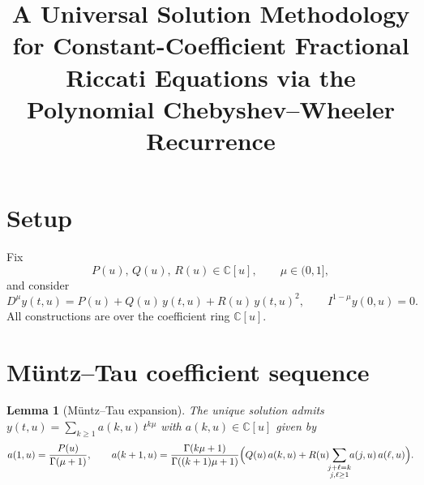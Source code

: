 \documentclass[11pt]{article}
\title{A Universal Solution Methodology for Constant-Coefficient
Fractional Riccati Equations via the Polynomial Chebyshev--Wheeler
Recurrence}
\author{}
\date{}
\newtheorem{lemma}[theorem]{Lemma}
\theoremstyle{definition}
\begin{document}
\maketitle

\section{Setup}

Fix
\[
P(u),\, Q(u),\, R(u) \in \mathbb{C}[u], \qquad \mu \in (0,1],
\]
and consider
\[
D^{\mu} y(t,u) = P(u) + Q(u)\, y(t,u) + R(u)\, y(t,u)^{2},
\qquad I^{1-\mu} y(0,u) = 0.
\]
All constructions are over the coefficient ring $\mathbb{C}[u]$.

\section{M\"untz--Tau coefficient sequence}

\begin{lemma}[M\"untz--Tau expansion]\label{lem:muntz}
The unique solution admits
$y(t,u) = \sum_{k\geq 1} a(k,u)\, t^{k\mu}$ with
$a(k,u) \in \mathbb{C}[u]$ given by
\[
a(1,u) = \frac{P(u)}{\Gamma(\mu+1)},
\qquad
a(k+1,u) = \frac{\Gamma(k\mu+1)}{\Gamma((k+1)\mu+1)}
\Bigl( Q(u)\, a(k,u) + R(u) \!\!\sum_{\substack{j+\ell=k\\ j,\ell\geq 1}}\!\!
a(j,u)\, a(\ell,u) \Bigr).
\]
\end{lemma}
\end{document}
